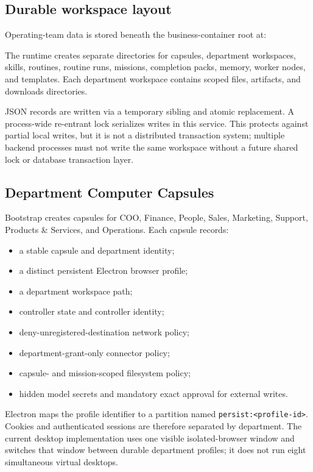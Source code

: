 \subsection{Durable workspace layout}

Operating-team data is stored beneath the business-container root at:
\begin{center}\small
{}
\end{center}
The runtime creates separate directories for capsules, department workspaces,
skills, routines, routine runs, missions, completion packs, memory, worker
nodes, and templates.  Each department workspace contains scoped files,
artifacts, and downloads directories.

JSON records are written via a temporary sibling and atomic replacement.  A
process-wide re-entrant lock serializes writes in this service.  This protects
against partial local writes, but it is not a distributed transaction system;
multiple backend processes must not write the same workspace without a future
shared lock or database transaction layer.

\subsection{Department Computer Capsules}

Bootstrap creates capsules for COO, Finance, People, Sales, Marketing, Support,
Products \& Services, and Operations.  Each capsule records:
\begin{itemize}[leftmargin=*]
\item a stable capsule and department identity;
\item a distinct persistent Electron browser profile;
\item a department workspace path;
\item controller state and controller identity;
\item deny-unregistered-destination network policy;
\item department-grant-only connector policy;
\item capsule- and mission-scoped filesystem policy;
\item hidden model secrets and mandatory exact approval for external writes.
\end{itemize}

Electron maps the profile identifier to a partition named
\texttt{persist:<profile-id>}.  Cookies and authenticated sessions are
therefore separated by department.  The current desktop implementation uses
one visible isolated-browser window and switches that window between durable
department profiles; it does not run eight simultaneous virtual desktops.

